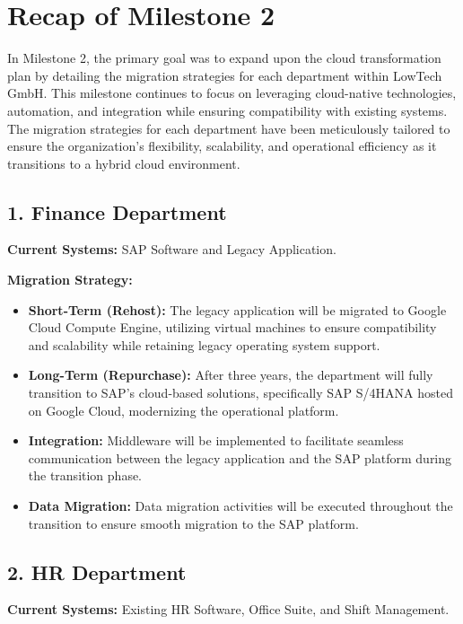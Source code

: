 \section{Recap of Milestone 2}

In Milestone 2, the primary goal was to expand upon the cloud transformation plan by detailing the migration strategies for each department within LowTech GmbH. This milestone continues to focus on leveraging cloud-native technologies, automation, and integration while ensuring compatibility with existing systems. The migration strategies for each department have been meticulously tailored to ensure the organization’s flexibility, scalability, and operational efficiency as it transitions to a hybrid cloud environment.

\subsection{1. Finance Department} 
\textbf{Current Systems:} SAP Software and Legacy Application.

\textbf{Migration Strategy:}
\begin{itemize}
    \item \textbf{Short-Term (Rehost):} The legacy application will be migrated to Google Cloud Compute Engine, utilizing virtual machines to ensure compatibility and scalability while retaining legacy operating system support.
    \item \textbf{Long-Term (Repurchase):} After three years, the department will fully transition to SAP's cloud-based solutions, specifically SAP S/4HANA hosted on Google Cloud, modernizing the operational platform.
    \item \textbf{Integration:} Middleware will be implemented to facilitate seamless communication between the legacy application and the SAP platform during the transition phase.
    \item \textbf{Data Migration:} Data migration activities will be executed throughout the transition to ensure smooth migration to the SAP platform.
\end{itemize}

\subsection{2. HR Department} 
\textbf{Current Systems:} Existing HR Software, Office Suite, and Shift Management.

